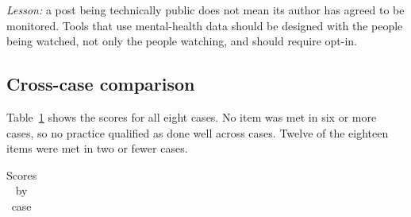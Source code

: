\documentclass[
  number,
  preprint]{elsarticle}
\begin{document}
\emph{Lesson:} a post being technically public does not mean its author
has agreed to be monitored. Tools that use mental-health data should be
designed with the people being watched, not only the people watching,
and should require opt-in.

\subsection{Cross-case comparison}\label{cross-case-comparison}

Table~\ref{tbl-case-comparison} shows the scores for all eight cases. No
item was met in six or more cases, so no practice qualified as done well
across cases. Twelve of the eighteen items were met in two or fewer
cases.

\begin{landscape}

\begin{longtable}[]{@{}
  >{\raggedright\arraybackslash}p{}
  >{\centering\arraybackslash}p{}
  >{\centering\arraybackslash}p{}
  >{\centering\arraybackslash}p{}
  >{\centering\arraybackslash}p{}
  >{\centering\arraybackslash}p{}
  >{\centering\arraybackslash}p{}
  >{\centering\arraybackslash}p{}
  >{\centering\arraybackslash}p{}
  >{\centering\arraybackslash}p{}@{}}

\caption{\label{tbl-case-comparison}Scores by case}

\tabularnewline


\end{longtable}
\end{landscape}
\end{document}
